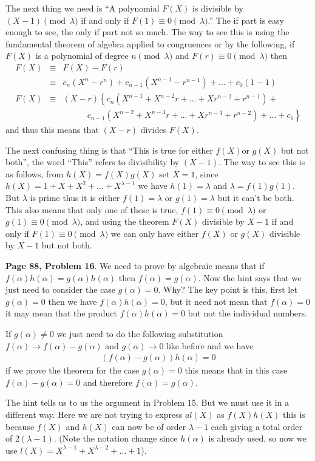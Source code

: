 \documentclass[aps,preprint,preprintnumbers,nofootinbib,showpacs,prd]{revtex4-1}
\newcommand{\nbea}{\begin{eqnarray*}}
\newcommand{\neea}{\end{eqnarray*}}
\begin{document}
The next thing we need is ``A polynomial $F(X)$ is divisible by $(X-1) \pmod{\lambda}$ if and only if $F(1) \equiv 0\pmod{\lambda}$.'' The if part is easy enough to see, the only if part not so much. The way to see this is using the fundamental theorem of algebra applied to congruences or by the following, if $F(X)$ is a polynomial of degree $n \pmod{\lambda}$ and $F(r) \equiv 0 \pmod{\lambda}$ then
%
\nbea
F(X) & \equiv & F(X) - F(r) \\
& \equiv & c_n (X^n - r^n) + c_{n-1}(X^{n-1} - r^{n-1}) + \dots + c_0(1 - 1) \\
F(X) & \equiv & (X - r) \left \{c_n(X^{n-1} + X^{n-2}r + \dots + X r^{n-2} + r^{n-1}) + \right .\\
& & \left.~~~~~~~~~~~~~ c_{n-1}(X^{n-2} + X^{n-3}r + \dots + X r^{n-3} + r^{n-2}) + \dots + c_1 \right \}
\neea
%
and thus this means that $(X - r)$ divides $F(X)$.

The next confusing thing is that ``This is true for either $f(X)$or $g(X)$ but not both'', the word ``This'' refers to divisibility by $(X-1)$. The way to see this is as follows, from $h(X) = f(X)g(X)$ set $X = 1$, since $h(X) = 1 + X + X^2 + \dots + X^{\lambda - 1}$ we have $h(1) = \lambda$ and $\lambda = f(1)g(1)$. But $\lambda$ is prime thus it is either $f(1) = \lambda$ or $g(1) = \lambda$ but it can't be both. This also means that only one of these is true, $f(1) \equiv 0 \pmod{\lambda}$ or $g(1) \equiv 0 \pmod{\lambda}$, and using the theorem $F(X)$  divisible by $X-1$ if and only if $F(1) \equiv 0\pmod{\lambda}$ we can only have either $f(X)$ or $g(X)$ divisible by $X - 1$ but not both.

{\bf Page 88, Problem 16}. We need to prove by algebraic means that if $f(\alpha)h(\alpha) = g(\alpha)h(\alpha)$ then $f(\alpha) = g(\alpha)$. Now the hint says that we just need to consider the case $g(\alpha) = 0$. Why? The key point is this, first let $g(\alpha) = 0$ then we have $f(\alpha)h(\alpha) = 0$, but it need not mean that $f(\alpha) = 0$ it may mean that the product $f(\alpha)h(\alpha) = 0$ but not the individual numbers.

If $g(\alpha) \neq 0$ we just need to do the following substitution $f(\alpha) \to f(\alpha) - g(\alpha)$ and $g(\alpha) \to 0$ like before and we have
%
\nbea
(f(\alpha) - g(\alpha))h(\alpha) = 0
\neea
%
if we prove the theorem for the case $g(\alpha) = 0$ this means that in this case $f(\alpha) - g(\alpha) = 0$ and therefore $f(\alpha) = g(\alpha)$.

The hint tells us to us the argument in Problem 15. But we must use it in a different way. Here we are not trying to express $al(X)$ as $f(X)h(X)$ this is because $f(X)$ and $h(X)$ can now be of order $\lambda - 1$ each giving a total order of $2(\lambda - 1)$. (Note the notation change since $h(\alpha)$ is already used, so now we use $l(X) = X^{\lambda-1} + X^{\lambda - 2} + \dots + 1$).
\end{document}
